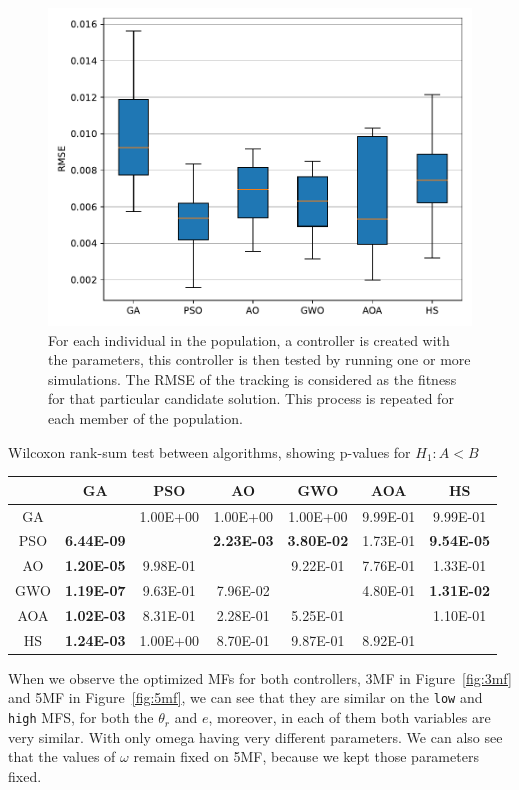 \documentclass[symmetry,article,submit,moreauthors,pdftex]{Definitions/mdpi}
\begin{document}
\begin{figure}[H]
\centering
\includegraphics[width=9 cm]{img/boxplot}
\caption{
For each individual in the population, a controller is created with the
parameters, this controller is then tested by running one or more simulations.
The RMSE of the tracking is considered as the fitness for that particular
candidate solution. This process is repeated for each member of the
population.
}\label{fig:boxplot}
\end{figure}


\begin{specialtable}[H] 
\small
\centering
\caption{Wilcoxon rank-sum test between algorithms, showing p-values for $H_1:A<B$}\label{tab:wilcoxon} 
\begin{tabular}{ccccccc}
\toprule 
    & GA       & PSO      & AO       & GWO      & AOA      & HS       \\
\midrule
GA  &          & 1.00E+00 & 1.00E+00 & 1.00E+00 & 9.99E-01 & 9.99E-01 \\
\midrule
PSO & \textbf{6.44E-09} &          & \textbf{2.23E-03} & \textbf{3.80E-02} & 1.73E-01 & \textbf{9.54E-05} \\
\midrule
AO  & \textbf{1.20E-05} & 9.98E-01 &          & 9.22E-01 & 7.76E-01 & 1.33E-01 \\
\midrule
GWO & \textbf{1.19E-07} & 9.63E-01 & 7.96E-02 &          & 4.80E-01 & \textbf{1.31E-02} \\
\midrule
AOA & \textbf{1.02E-03} & 8.31E-01 & 2.28E-01 & 5.25E-01 &          & 1.10E-01 \\
\midrule
HS  & \textbf{1.24E-03} & 1.00E+00 & 8.70E-01 & 9.87E-01 & 8.92E-01 &          \\
\bottomrule
\end{tabular}
\end{specialtable}

When we observe the optimized MFs for both controllers, 3MF in
Figure~\ref{fig:3mf} and 5MF in Figure~\ref{fig:5mf}, we can see that they are
similar on the \texttt{low} and \texttt{high} MFS, for both the $\theta_r$ and
$e$, moreover, in each of them both variables are very similar. With only omega
having very different parameters.  We can also see that the values of $\omega$
remain fixed on 5MF, because we kept those parameters fixed.
\end{document}
